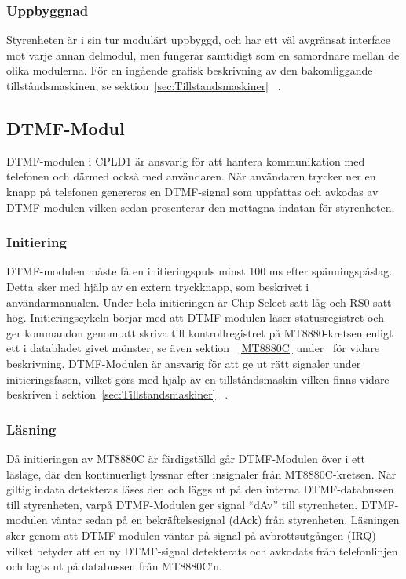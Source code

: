 \documentclass[a4paper,11pt]{article}
\begin{document}
	\subsubsection{Uppbyggnad}

	Styrenheten är i sin tur modulärt uppbyggd, och har ett väl avgränsat interface mot varje annan delmodul, men fungerar samtidigt som en samordnare mellan de olika modulerna.	För en ingående grafisk beskrivning av den bakomliggande tillståndsmaskinen, se sektion~\ref{sec:Tillstandsmaskiner} ~.

	\subsection{DTMF-Modul}
		
	DTMF-modulen i CPLD1 är ansvarig för att hantera kommunikation med telefonen och därmed också med användaren.
	När användaren trycker ner en knapp på telefonen genereras en DTMF-signal som uppfattas och avkodas av DTMF-modulen vilken sedan presenterar den mottagna indatan för styrenheten.
		
	\subsubsection{Initiering}

	DTMF-modulen måste få en initieringspuls minst 100 ms efter spänningspåslag. Detta sker med hjälp av
	en extern tryckknapp, som beskrivet i användarmanualen. Under hela initieringen är Chip Select satt låg
	och RS0 satt hög. Initieringscykeln börjar med att DTMF-modulen läser statusregistret och ger kommandon genom att skriva till kontrollregistret på MT8880-kretsen enligt ett i databladet givet mönster, se även sektion ~\ref{MT8880C} under~ för vidare beskrivning.
	DTMF-Modulen är ansvarig för att ge ut rätt signaler under initieringsfasen, vilket görs med hjälp av en tillståndsmaskin vilken finns vidare beskriven i sektion~\ref{sec:Tillstandsmaskiner} ~.
		
	\subsubsection{Läsning}

	Då initieringen av MT8880C är färdigställd går DTMF-Modulen över i ett läsläge, där den kontinuerligt lyssnar efter insignaler från MT8880C-kretsen. När giltig indata detekteras läses den och läggs ut på den interna DTMF-databussen till styrenheten, varpå DTMF-Modulen ger signal  ``dAv'' till styrenheten. DTMF-modulen väntar sedan på en bekräftelsesignal (dAck) från styrenheten. Läsningen sker genom att DTMF-modulen väntar på signal på avbrottsutgången (IRQ) vilket betyder att en ny DTMF-signal detekterats  och avkodats från telefonlinjen och lagts ut på databussen från MT8880C'n.
\end{document}
